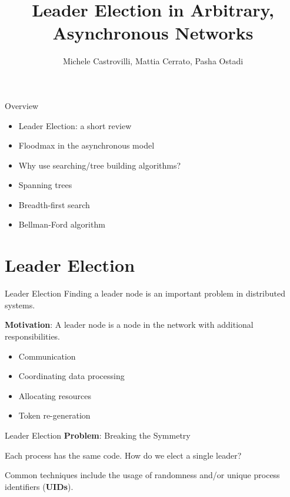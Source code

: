 \documentclass[pdf]{beamer}
\title{Leader Election in Arbitrary, Asynchronous Networks}
\author{Michele Castrovilli, Mattia Cerrato, Pasha Ostadi}
\date{\formatdate{18}{01}{2017}}
\begin{document}
\Large
\begin{frame}
    \maketitle
\end{frame}

\normalsize
\begin{frame}{Overview}
    \begin{itemize}
        \item Leader Election: a short review
        \item Floodmax in the asynchronous model
        \item Why use searching/tree building algorithms?
        \item Spanning trees
        \item Breadth-first search
        \item Bellman-Ford algorithm 
    \end{itemize}
\end{frame}

\section{Leader Election}
\begin{frame}{Leader Election}
    Finding a leader node is an important problem in distributed systems.
    
    \vspace{12pt}
    \textbf{Motivation}: A leader node is a node in the network with additional responsibilities.
    \begin{itemize}
        \item Communication
        \item Coordinating data processing
        \item Allocating resources
        \item Token re-generation
   \end{itemize} 
\end{frame}

\begin{frame}{Leader Election}
    \textbf{Problem}: Breaking the Symmetry 
    
    \vspace{12pt}
    Each process has the same code. How do we elect a single leader?
    
    \vspace{12pt}
    Common techniques include the usage of randomness and/or unique process identifiers (\textbf{UIDs}).
\end{frame}
\end{document}

